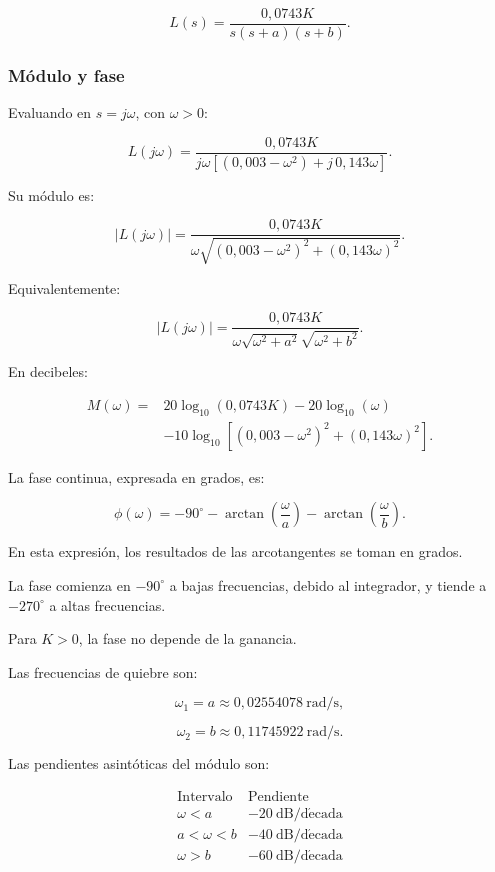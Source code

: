 \documentclass[12pt,a4paper]{article}
\begin{document}
\[
L(s)
=
\frac{0{,}0743K}
{s(s+a)(s+b)}.
\]


\subsubsection*{Módulo y fase}

Evaluando en $s=j\omega$, con $\omega>0$:

\[
L(j\omega)
=
\frac{0{,}0743K}
{
j\omega
\left[
(0{,}003-\omega^2)
+j\,0{,}143\omega
\right]
}.
\]

Su módulo es:

\[
\boxed{
|L(j\omega)|
=
\frac{0{,}0743K}
{
\omega
\sqrt{
(0{,}003-\omega^2)^2
+
(0{,}143\omega)^2
}
}.
}
\]

Equivalentemente:

\[
|L(j\omega)|
=
\frac{0{,}0743K}
{
\omega
\sqrt{\omega^2+a^2}
\sqrt{\omega^2+b^2}
}.
\]

En decibeles:

\begin{align*}
M(\omega)
={}&
20\log_{10}(0{,}0743K)
-20\log_{10}(\omega)
\\
&-
10\log_{10}
\left[
(0{,}003-\omega^2)^2
+
(0{,}143\omega)^2
\right].
\end{align*}

La fase continua, expresada en grados, es:

\[
\boxed{
\phi(\omega)
=
-90^\circ
-
\arctan\left(\frac{\omega}{a}\right)
-
\arctan\left(\frac{\omega}{b}\right).
}
\]

En esta expresión, los resultados de las arcotangentes
se toman en grados.

La fase comienza en $-90^\circ$ a bajas frecuencias,
debido al integrador, y tiende a $-270^\circ$
a altas frecuencias.

Para $K>0$, la fase no depende de la ganancia.

Las frecuencias de quiebre son:

\[
\omega_1
=
a
\approx0{,}02554078\ \mathrm{rad/s},
\]

\[
\omega_2
=
b
\approx0{,}11745922\ \mathrm{rad/s}.
\]

Las pendientes asintóticas del módulo son:

\[
\begin{array}{c|c}
\text{Intervalo} & \text{Pendiente}\\
\hline
\omega<a
&
-20\ \mathrm{dB/d\acute{e}cada}\\
a<\omega<b
&
-40\ \mathrm{dB/d\acute{e}cada}\\
\omega>b
&
-60\ \mathrm{dB/d\acute{e}cada}
\end{array}
\]
\end{document}
